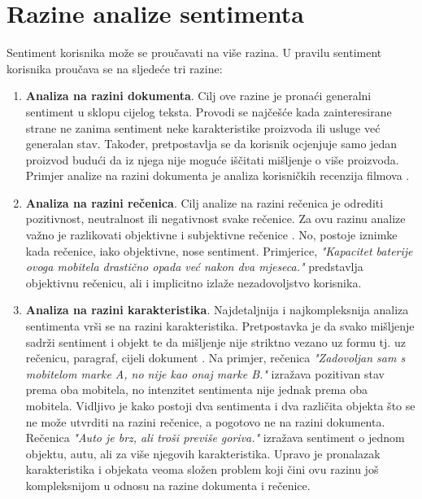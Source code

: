 \documentclass[times, utf8, zavrsni, numeric]{fer}
\begin{document}
\section{Razine analize sentimenta} \label{sarazine}
Sentiment korisnika može se proučavati na više razina.
U pravilu sentiment korisnika proučava se na sljedeće tri razine:

\begin{enumerate}
  \item \textbf{Analiza na razini dokumenta}. 
  Cilj ove razine je pronaći generalni sentiment u sklopu cijelog teksta. 
  Provodi se najčešće kada zainteresirane strane ne zanima sentiment neke karakteristike proizvoda
  ili usluge već generalan stav.
  Također, pretpostavlja se da korisnik ocjenjuje samo jedan proizvod budući da iz njega nije moguće
  iščitati mišljenje o više proizvoda.
  Primjer analize na razini dokumenta je analiza korisničkih recenzija filmova 
  \cite{Pang+Lee+Vaithyanathan:02a}.

  \item \textbf{Analiza na razini rečenica}.
  Cilj analize na razini rečenica je odrediti pozitivnost, neutralnost ili negativnost svake rečenice.
  Za ovu razinu analize važno je razlikovati objektivne i subjektivne rečenice 
  \cite{wiebe-bruce-o'hara:1999:ACL}.
  No, postoje iznimke kada rečenice, iako objektivne, nose sentiment.
  Primjerice, \textit{"Kapacitet baterije ovoga mobitela drastično opada već nakon dva mjeseca."}
  predstavlja objektivnu rečenicu, ali i implicitno izlaže nezadovoljstvo korisnika.

  \item \textbf{Analiza na razini karakteristika}.
  Najdetaljnija i najkompleksnija analiza sentimenta vrši se na razini karakteristika.
  Pretpostavka je da svako mišljenje sadrži sentiment i objekt te da mišljenje nije striktno vezano
  uz formu tj. uz rečenicu, paragraf, cijeli dokument \cite{Hu:2004:MSC:1014052.1014073}.
  Na primjer, rečenica \textit{"Zadovoljan sam s mobitelom marke A, no nije kao onaj marke B."}
  izražava pozitivan stav prema oba mobitela, no intenzitet sentimenta nije jednak prema oba mobitela.
  Vidljivo je kako postoji dva sentimenta i dva različita objekta što se ne može utvrditi na razini rečenice,
  a pogotovo ne na razini dokumenta.
  Rečenica \textit{"Auto je brz, ali troši previše goriva."} izražava sentiment o jednom objektu, autu, 
  ali za više njegovih karakteristika.
  Upravo je pronalazak karakteristika i objekata veoma složen problem koji čini ovu razinu još kompleksnijom
  u odnosu na razine dokumenta i rečenice. 
\end{enumerate}
\end{document}
